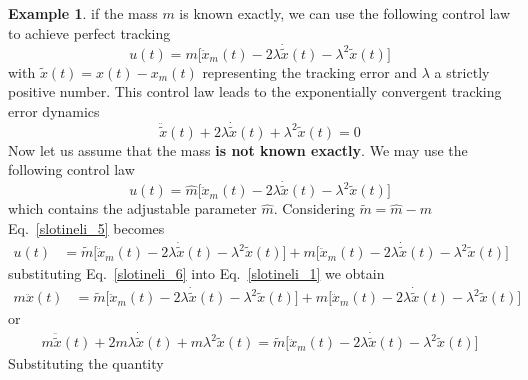 \documentclass[11pt,a4paper,oneside]{book}
\numberwithin{equation}{section}
\theoremstyle{it}
\theoremstyle{definition}
\newtheorem{example}{Example}[chapter]
\begin{document}
\begin{example}
	if the mass $m$ is known exactly, we can use the following control law to achieve perfect tracking 
	\begin{equation}\label{slotineli_3}
		u(t)=m\Big[\ddot{x}_m(t)-2\lambda\dot{\tilde{x}}(t)-\lambda^2\tilde{x}(t)\Big]
	\end{equation} 
	with $\tilde{x}(t)=x(t)-x_m(t)$ representing the tracking error and $\lambda$ a strictly positive number. This control law leads to the exponentially convergent tracking error dynamics
	\begin{equation}\label{slotineli_4}
		\ddot{\tilde{x}}(t)+2\lambda\dot{\tilde{x}}(t)+\lambda^2\tilde{x}(t)=0
	\end{equation} 
	Now let us assume that the mass \textbf{is not known exactly}. We may use the following control law
	\begin{equation}\label{slotineli_5}
		u(t)=\hat{m}\Big[\ddot{x}_m(t)-2\lambda\dot{\tilde{x}}(t)-\lambda^2\tilde{x}(t)\Big]
	\end{equation} 
	which contains the adjustable parameter $\hat{m}$. Considering $\tilde{m} = \hat{m}-m$ Eq.~\ref{slotineli_5} becomes	
	\begin{equation}\label{slotineli_6}
		\begin{aligned}
			u(t) &= \tilde{m}\Big[\ddot{x}_m(t)-2\lambda\dot{\tilde{x}}(t)-\lambda^2\tilde{x}(t)\Big] + {m}\Big[\ddot{x}_m(t)-2\lambda\dot{\tilde{x}}(t)-\lambda^2\tilde{x}(t)\Big]
		\end{aligned}
	\end{equation} 
	substituting Eq.~\ref{slotineli_6} into Eq.~\ref{slotineli_1} we obtain
	\begin{equation}\label{slotineli_7}
		\begin{aligned}
			m\ddot{x}(t) &= \tilde{m}\Big[\ddot{x}_m(t)-2\lambda\dot{\tilde{x}}(t)-\lambda^2\tilde{x}(t)\Big] + {m}\Big[\ddot{x}_m(t)-2\lambda\dot{\tilde{x}}(t)-\lambda^2\tilde{x}(t)\Big]
		\end{aligned}
	\end{equation} 
	or 
	\begin{equation}\label{slotineli_8}
		\begin{aligned}
			m\ddot{\tilde{x}}(t) +2m\lambda\dot{\tilde{x}}(t)+m\lambda^2\tilde{x}(t) =  \tilde{m}\Big[\ddot{x}_m(t)-2\lambda\dot{\tilde{x}}(t)-\lambda^2\tilde{x}(t)\Big]
		\end{aligned}
	\end{equation} 
	Substituting the quantity 
	\begin{equation}\label{slotineli_9}
		\begin{aligned}

\end{aligned}
\end{equation}
\end{example}
\end{document}
